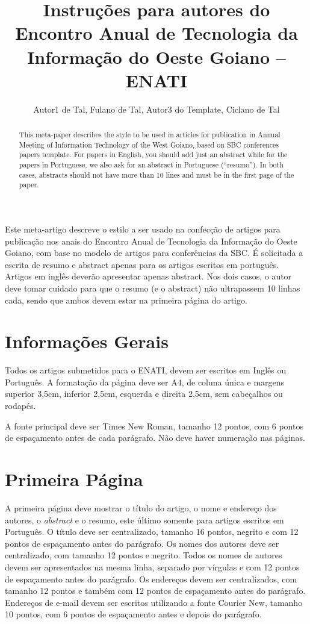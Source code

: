 \documentclass[12pt]{article}
\title{Instruções para autores do Encontro Anual de Tecnologia da Informação do Oeste Goiano -- ENATI}
\author{Autor1 de Tal, Fulano de Tal\inst{2}, Autor3 do Template\inst{1}, Ciclano de Tal\inst{3} }
\begin{document}
 

\maketitle

\begin{abstract}
This meta-paper describes the style to be used in articles for publication in Annual Meeting of Information Technology of the West Goiano, based on SBC conferences papers template. For papers in English, you should add just an abstract while for the papers in Portuguese, we also ask for an abstract in Portuguese (``resumo''). In both cases, abstracts should not have more than 10 lines and must be in the first page of the paper.
\end{abstract}
     
\begin{resumo} 
  Este meta-artigo descreve o estilo a ser usado na confecção de artigos para publicação nos anais do Encontro Anual de Tecnologia da Informação do Oeste Goiano, com base no modelo de artigos para conferências da SBC. É solicitada a escrita de resumo e abstract apenas para os artigos escritos em português. Artigos em inglês deverão apresentar apenas abstract. Nos dois casos, o autor deve tomar cuidado para que o resumo (e o abstract) não ultrapassem 10 linhas cada, sendo que ambos devem estar na primeira página do artigo.
\end{resumo}


\section{Informações Gerais}

Todos os artigos submetidos para o ENATI, devem ser escritos em Inglês ou Português. A formatação da página deve ser A4, de coluna única e margens superior 3,5cm, inferior 2,5cm, esquerda e direita 2,5cm, sem cabeçalhos ou rodapés.

A fonte principal deve ser Times New Roman, tamanho 12 pontos, com 6 pontos de espaçamento antes de cada parágrafo. Não deve haver numeração nas páginas.

\section{Primeira Página} \label{sec:firstpage}

A primeira página deve mostrar o título do artigo, o nome e endereço dos autores, o \textit{abstract} e o resumo, este último somente para artigos escritos em Português. O título deve ser centralizado, tamanho 16 pontos, negrito e com 12 pontos de espaçamento antes do parágrafo. Os nomes dos autores deve ser centralizado, com tamanho 12 pontos e negrito. Todos os nomes de autores devem ser apresentados na mesma linha, separado por vírgulas e com 12 pontos de espaçamento antes do parágrafo. Os endereços devem ser centralizados, com tamanho 12 pontos e também com 12 pontos de espaçamento antes do parágrafo. Endereços de e-mail devem ser escritos utilizando a fonte Courier New, tamanho 10 pontos, com 6 pontos de espaçamento antes e depois do parágrafo.
\end{document}
